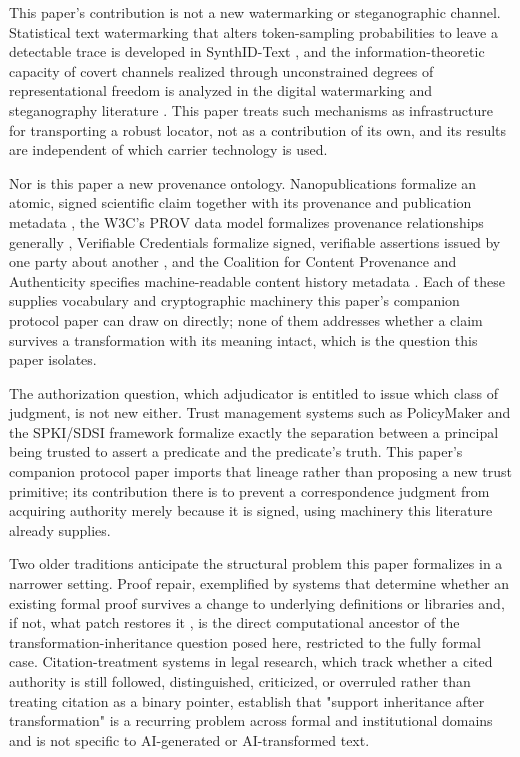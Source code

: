 \documentclass[11pt]{article}
\begin{document}
This paper's contribution is not a new watermarking or steganographic channel. Statistical text watermarking that alters token-sampling probabilities to leave a detectable trace is developed in SynthID-Text \cite{dathathri2024}, and the information-theoretic capacity of covert channels realized through unconstrained degrees of representational freedom is analyzed in the digital watermarking and steganography literature \cite{moulin2003, cachin2004}. This paper treats such mechanisms as infrastructure for transporting a robust locator, not as a contribution of its own, and its results are independent of which carrier technology is used.

Nor is this paper a new provenance ontology. Nanopublications formalize an atomic, signed scientific claim together with its provenance and publication metadata \cite{groth2010}, the W3C's PROV data model formalizes provenance relationships generally \cite{provo}, Verifiable Credentials formalize signed, verifiable assertions issued by one party about another \cite{vcdm}, and the Coalition for Content Provenance and Authenticity specifies machine-readable content history metadata \cite{c2pa}. Each of these supplies vocabulary and cryptographic machinery this paper's companion protocol paper can draw on directly; none of them addresses whether a claim survives a transformation with its meaning intact, which is the question this paper isolates.

The authorization question, which adjudicator is entitled to issue which class of judgment, is not new either. Trust management systems such as PolicyMaker \cite{blaze1996} and the SPKI/SDSI framework \cite{rivest1996, ellison1999} formalize exactly the separation between a principal being trusted to assert a predicate and the predicate's truth. This paper's companion protocol paper imports that lineage rather than proposing a new trust primitive; its contribution there is to prevent a correspondence judgment from acquiring authority merely because it is signed, using machinery this literature already supplies.

Two older traditions anticipate the structural problem this paper formalizes in a narrower setting. Proof repair, exemplified by systems that determine whether an existing formal proof survives a change to underlying definitions or libraries and, if not, what patch restores it \cite{ringer2020}, is the direct computational ancestor of the transformation-inheritance question posed here, restricted to the fully formal case. Citation-treatment systems in legal research, which track whether a cited authority is still followed, distinguished, criticized, or overruled rather than treating citation as a binary pointer, establish that "support inheritance after transformation" is a recurring problem across formal and institutional domains and is not specific to AI-generated or AI-transformed text.
\end{document}
